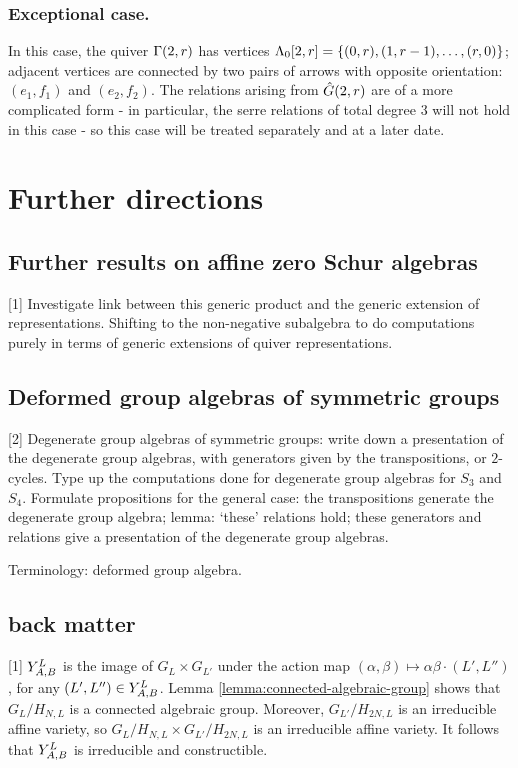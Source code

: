\documentclass[a4paper, 11pt]{report}
\begin{document}
\subsection{Exceptional case.}

In this case, the quiver $\presentationquiver[2,r]$ has vertices $\compositions[2,r]=\{(0,r), (1,r-1),\ldots, (r,0)\}$; adjacent vertices are connected by two pairs of arrows with opposite orientation: $(e_1,f_1)$ and $(e_2,f_2)$. The relations arising from $\generic[2,r]$ are of a more complicated form - in particular, the serre relations of total degree $3$ will not hold in this case - so this case will be treated separately and at a later date.

\chapter{Further directions}

\section{Further results on affine zero Schur algebras}

[1] Investigate link between this generic product and the generic extension of representations. Shifting to the non-negative subalgebra to do computations purely in terms of generic extensions of quiver representations.

\section{Deformed group algebras of symmetric groups}

[2] Degenerate group algebras of symmetric groups: write down a presentation of the degenerate group algebras, with generators given by the transpositions, or $2$-cycles. Type up the computations done for degenerate group algebras for $S_3$ and $S_4$. Formulate propositions for the general case: the transpositions generate the degenerate group algebra; lemma: `these' relations hold; these generators and relations give a presentation of the degenerate group algebras.

Terminology: deformed group algebra.

\section{back matter}

[1] $\yprod[L]{A,B}$ is the image of $G_L\times G_{L'}$ under the action map $(\alpha,\beta)\mapsto \alpha\beta\cdot(L',L'')$, for any $(L',L'')\in\yprod[L]{A,B}$. Lemma \ref{lemma:connected-algebraic-group} shows that $G_L/{H_{N,L}}$ is a connected algebraic group. Moreover, $G_{L'}/{H_{2N,L}}$ is an irreducible affine variety, so $G_{L}/{H_{N,L}}\times G_{L'}/{H_{2N,L}}$ is an irreducible affine variety. It follows that $\yprod[L]{A,B}$ is irreducible and constructible.


\nocite{*}
\printbibliography
\end{document}
